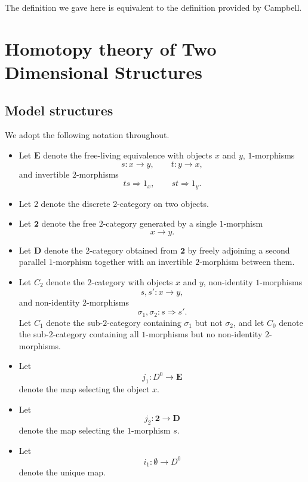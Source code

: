 \documentclass{tac}
\begin{document}
The definition we gave here is equivalent to the definition provided by Campbell.

\section{Homotopy theory of Two Dimensional Structures}

\subsection*{Model structures}
We adopt the following notation throughout.

\begin{itemize}
    \item Let $\mathbf{E}$ denote the free-living equivalence with objects
    $x$ and $y$, $1$-morphisms
    \[
    s:x\to y,\qquad t:y\to x,
    \]
    and invertible $2$-morphisms
    \[
    ts\Rightarrow 1_x,
    \qquad
    st\Rightarrow 1_y.
    \]

    \item Let $2$ denote the discrete $2$-category on two objects.

    \item Let $\mathbf{2}$ denote the free $2$-category generated by a
    single $1$-morphism
    \[
    x\longrightarrow y.
    \]

    \item Let $\mathbf{D}$ denote the $2$-category obtained from
    $\mathbf{2}$ by freely adjoining a second parallel $1$-morphism
    together with an invertible $2$-morphism between them.

    \item Let $C_2$ denote the $2$-category with objects $x$ and $y$,
    non-identity $1$-morphisms
    \[
    s,s':x\to y,
    \]
    and non-identity $2$-morphisms
    \[
    \sigma_1,\sigma_2:s\Rightarrow s'.
    \]
    Let $C_1$ denote the sub-$2$-category containing $\sigma_1$ but not
    $\sigma_2$, and let $C_0$ denote the sub-$2$-category containing all
    $1$-morphisms but no non-identity $2$-morphisms.

    \item Let
    \[
    j_1:D^0\longrightarrow\mathbf{E}
    \]
    denote the map selecting the object $x$.

    \item Let
    \[
    j_2:\mathbf{2}\longrightarrow\mathbf{D}
    \]
    denote the map selecting the $1$-morphism $s$.

    \item Let
    \[
    i_1:\emptyset\longrightarrow D^0
    \]
    denote the unique map.


\end{itemize}
\end{document}
